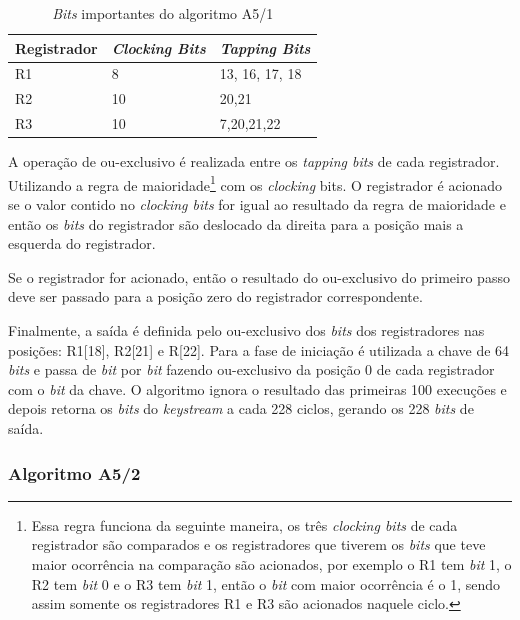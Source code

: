 \begin{table}[h]
\centering
	\begin{tabular}{|l|l|l|}
		\hline
		Registrador & \textit{Clocking Bits} & \textit{Tapping Bits} \\ \hline
		R1 & 8 & 13, 16, 17, 18 \\ \hline
		R2 & 10 & 20,21 \\ \hline
		R3 & 10 & 7,20,21,22 \\ \hline	
	\end{tabular}
	\caption{\textit{Bits} importantes do algoritmo A5/1}
	\label{important-bits}
\end{table}

A operação de ou-exclusivo é realizada entre os \textit{tapping bits} de cada registrador. Utilizando a regra de maioridade\footnote{Essa regra funciona da seguinte maneira, os três \textit{clocking bits} de cada registrador são comparados e os registradores que tiverem os \textit{bits} que teve maior ocorrência na comparação são acionados, por exemplo o R1 tem \textit{bit} 1, o R2 tem \textit{bit} 0 e o R3 tem \textit{bit} 1, então o \textit{bit} com maior ocorrência é o 1, sendo assim somente os registradores R1 e R3 são acionados naquele ciclo.} com os \textit{clocking} bits. O registrador é acionado se o valor contido no \textit{clocking bits} for igual ao resultado da regra de maioridade e então os \textit{bits} do registrador são deslocado da direita para a posição mais a esquerda do registrador.


Se o registrador for acionado, então o resultado do ou-exclusivo do primeiro passo deve ser passado para a posição zero do registrador correspondente.


Finalmente, a saída é definida pelo ou-exclusivo dos \textit{bits} dos registradores nas posições: R1[18], R2[21] e R[22]. Para a fase de iniciação é utilizada a chave de 64 \textit{bits} e passa de \textit{bit} por \textit{bit} fazendo ou-exclusivo da posição 0 de cada registrador com o \textit{bit} da chave. O algoritmo ignora o resultado das primeiras 100 execuções e depois retorna os \textit{bits} do \textit{keystream} a cada 228 ciclos, gerando os 228 \textit{bits} de saída.


\subsubsection{Algoritmo A5/2}
\label{algorithm-a52}

